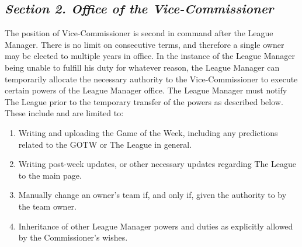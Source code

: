 \documentclass{article}
\begin{document}
    \subsection{\textit{Section 2. Office of the Vice-Commissioner}}
    The position of Vice-Commissioner is second in command after the League Manager. There is no limit on consecutive terms, and therefore a single owner may be elected to multiple years in office. In the instance of the League Manager being unable to fulfill his duty for whatever reason, the League Manager can temporarily allocate the necessary authority to the Vice-Commissioner to execute certain powers of the League Manager office. The League Manager must notify The League prior to the temporary transfer of the powers as described below. These include and are limited to:
    \begin{enumerate}[label=\Alph*)]
        \item Writing and uploading the Game of the Week, including any predictions related to the GOTW or The League in general.
        \item Writing post-week updates, or other necessary updates regarding The League to the main page.
        \item Manually change an owner’s team if, and only if, given the authority to by the team owner.
        \item Inheritance of other League Manager powers and duties as explicitly allowed by the Commissioner’s wishes.
    \end{enumerate}
\end{document}
